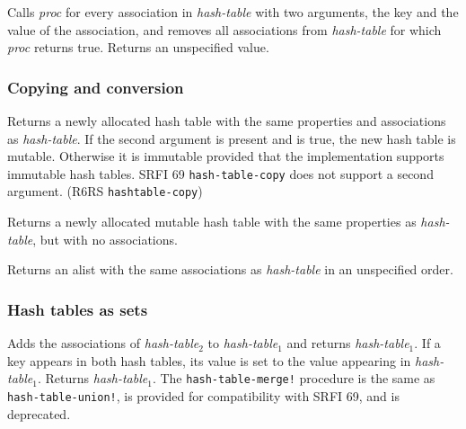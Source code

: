\begin{entry}{%
  }

  Calls \emph{proc} for every association in \emph{hash-table} with
  two arguments, the key and the value of the association, and removes
  all associations from \emph{hash-table} for which \emph{proc}
  returns true.  Returns an unspecified value.
\end{entry}

\subsubsection{Copying and conversion}

\begin{entry}{%
  }

  Returns a newly allocated hash table with the same properties and
  associations as \emph{hash-table}. If the second argument is present
  and is true, the new hash table is mutable. Otherwise it is
  immutable provided that the implementation supports immutable hash
  tables. SRFI 69 \texttt{hash-table-copy} does not support a second
  argument. (R6RS \texttt{hashtable-copy})
\end{entry}

\begin{entry}{%
  }

  Returns a newly allocated mutable hash table with the same
  properties as \emph{hash-table}, but with no associations.
\end{entry}

\begin{entry}{%
  }

  Returns an alist with the same associations as \emph{hash-table} in
  an unspecified order.
\end{entry}

\subsubsection{Hash tables as sets}\label{Hashtablesassets}

\begin{entry}{%
  }

  Adds the associations of \emph{hash-table$_2$} to
  \emph{hash-table$_1$} and returns \emph{hash-table$_1$}. If a key
  appears in both hash tables, its value is set to the value appearing
  in \emph{hash-table$_1$}. Returns \emph{hash-table$_1$}. The
  \texttt{hash-table-merge!}  procedure is the same as
  \texttt{hash-table-union!}, is provided for compatibility with SRFI
  69, and is deprecated.
\end{entry}

